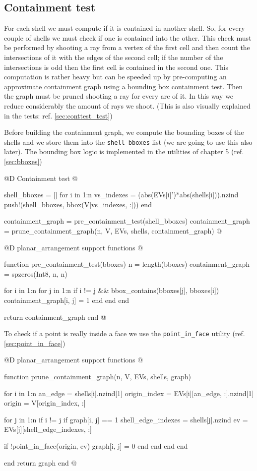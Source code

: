 \subsection{Containment test}

For each shell we must compute if it is contained
in another shell. So, for every couple of shells
we must check if one is contained into the other.
This check must be performed by shooting a ray from
a vertex of the first cell and then count the intersections
of it with the edges of the second cell; if the number 
of the intersections is odd then the first cell is contained
in the second one. This computation is rather heavy but can be
speeded up by pre-computing an approximate containment graph 
using a bounding box containment test. Then the graph must be
pruned shooting a ray for every arc of it. In this way we reduce
considerably the amount of rays we shoot. (This is also visually
explained in the tests: ref. \ref{sec:conttest_test})

Before building the containment graph, we
compute the bounding boxes of the shells and we store them into
the \texttt{shell\_bboxes} list (we are going to use this also later).
The bounding box logic is implemented in the utilities of chapter 5 
(ref. \ref{sec:bboxes})

@D Containment test
@{shell_bboxes = []
for i in 1:n
    vs_indexes = (abs(EVs[i]')*abs(shells[i])).nzind
    push!(shell_bboxes, bbox(V[vs_indexes, :]))
end

containment_graph = pre_containment_test(shell_bboxes)
containment_graph = prune_containment_graph(n, V, EVs, shells, containment_graph)
@}

@D planar\_arrangement support functions
@{function pre_containment_test(bboxes)
    n = length(bboxes)
    containment_graph = spzeros(Int8, n, n)

    for i in 1:n
        for j in 1:n
            if i != j && bbox_contains(bboxes[j], bboxes[i])
                containment_graph[i, j] = 1
            end
        end
    end

    return containment_graph
end
@}

To check if a point is really inside a face we use the
\texttt{point\_in\_face} utility (ref. \ref{sec:point_in_face})

@D planar\_arrangement support functions
@{function prune_containment_graph(n, V, EVs, shells, graph)
    
    for i in 1:n
        an_edge = shells[i].nzind[1]
        origin_index = EVs[i][an_edge, :].nzind[1]
        origin = V[origin_index, :]
 
        for j in 1:n
            if i != j
                if graph[i, j] == 1
                    shell_edge_indexes = shells[j].nzind
                    ev = EVs[j][shell_edge_indexes, :]

                    if !point_in_face(origin, ev)
                        graph[i, j] = 0
                    end
                end
             end
         end

     end
     return graph
end
@}

